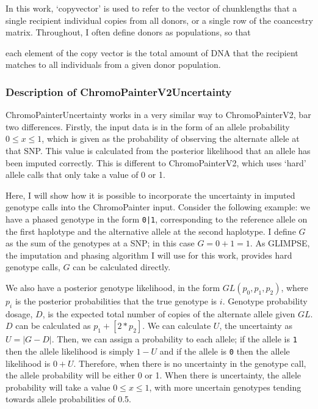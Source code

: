 In this work, `copyvector' is used to refer to the vector of chunklengths that a single recipient individual copies from all donors, or a single row of the coancestry matrix. Throughout, I often define donors as populations, so that{ each element of the copy vector is the total amount of DNA that the recipient matches to all individuals from a given donor population.

\subsubsection{Description of ChromoPainterV2Uncertainty} \label{sec:DescriptionChromoPainterV2Uncertainty}

ChromoPainterUncertainty works in a very similar way to ChromoPainterV2, bar two differences. Firstly, the input data is in the form of an allele probability $0 \leq x \leq 1$, which is given as the probability of observing the alternate allele at that SNP. This value is calculated from the posterior likelihood that an allele has been imputed correctly. This is different to ChromoPainterV2, which uses `hard' allele calls that only take a value of 0 or 1.

Here, I will show how it is possible to incorporate the uncertainty in imputed genotype calls into the ChromoPainter input. Consider the following example: we have a phased genotype in the form \texttt{0|1}, corresponding to the reference allele on the first haplotype and the alternative allele at the second haplotype. I define $G$ as the sum of the genotypes at a SNP; in this case $G=0+1=1$. As GLIMPSE, the imputation and phasing algorithm I will use for this work, provides hard genotype calls, $G$ can be calculated directly.

We also have a posterior genotype likelihood, in the form $GL(p_{0}, p_{1}, p_{2})$, where $p_i$ is the posterior probabilities that the true genotype is $i$. Genotype probability dosage, $D$, is the expected total number of copies of the alternate allele given $GL$. $D$ can be calculated as $p_{1} + [2*p_{2}]$. We can calculate $U$, the uncertainty as $U = |G-D|$. Then, we can assign a probability to each allele; if the allele is \texttt{1} then the allele likelihood is simply $1 - U$ and if the allele is \texttt{0} then the allele likelihood is $0 + U$. Therefore, when there is no uncertainty in the genotype call, the allele probability will be either 0 or 1. When there is uncertainty, the allele probability will take a value $0 \leq x \leq 1$, with more uncertain genotypes tending towards allele probabilities of 0.5. 



}
